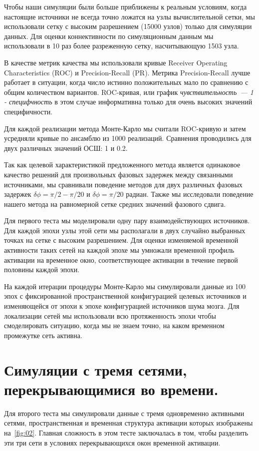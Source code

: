 Чтобы наши симуляции были больше приближены к реальным условиям, когда настоящие источники
не всегда точно ложатся на узлы вычислительной сетки, мы использовали сетку с высоким
разрешением (15000 узлов) только для симуляции данных. Для оценки
коннективности по симуляционным данным мы использовали в 10 раз более разреженную сетку,
насчитывающую 1503 узла.

В качестве метрик качества мы использовали кривые Receiver Operating Characteristics (ROC)
и Precision-Recall (PR). Метрика Precision-Recall лучше работает в ситуации, когда
число истинно положительных мало по сравнению с общим количеством вариантов.
ROC-кривая, или график \emph{чувствительность~--- 1 - специфчность} в этом случае информативна
только для очень высоких значений специфичности.

Для каждой реализации метода Монте-Карло мы считали ROC-кривую и затем
усредняли кривые по ансамблю из 1000 реализаций. Сравнения проводились для двух различных
значений ОСШ: 1 и 0.2. 

Так как целевой характеристикой предложенного метода является одинаковое качество
решений для произвольных фазовых задержек между связанными источниками, мы сравнивали
поведение методов для двух различных фазовых задержек $\delta\phi=\pi/2-\pi/20$ и
$\delta\phi=\pi/20$ радиан. Также мы исследовали поведение нашего метода на
равномерной сетке средних значений фазового сдвига.

Для первого теста мы моделировали одну пару взаимодействующих источников. Для каждой эпохи
узлы этой сети мы располагали в двух случайно выбранных точках на сетке с высоким разрешением.
Для оценки изменяемой временной активности таких сетей на каждой эпохе мы умножали временной
профиль активации на временное окно, соответствующее активации в течение первой половины
каждой эпохи. %

На каждой итерации процедуры Монте-Карло мы симулировали данные из 100 эпох с фиксированной
пространственной конфигурацией целевых источников и изменяющейся от эпохи к эпохе конфигурацией
источников шума мозга. Для локализации сетей мы использовали всю протяженность эпохи
чтобы смоделировать ситуацию, когда мы не знаем точно, на каком временном промежутке
сеть активна.

\section{Симуляции с тремя сетями, перекрывающимися во времени.}\label{sec:three_ntw}
Для второго теста мы симулировали данные с тремя одновременно активными сетями, пространственная
и временная структура активации которых изображены на~\ref{fig:02}.
Главная сложность в этом тесте заключалась в том, чтобы разделить эти три сети в условиях
перекрывающихся окон временной активации.

